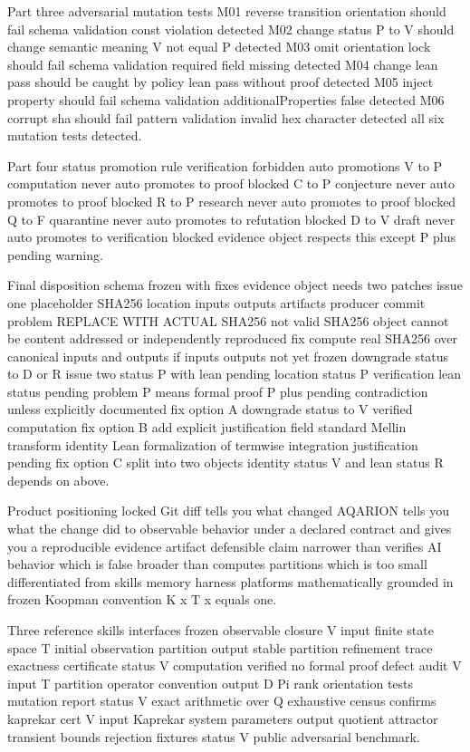 Part three adversarial mutation tests M01 reverse transition orientation should fail schema validation const violation detected M02 change status P to V should change semantic meaning V not equal P detected M03 omit orientation lock should fail schema validation required field missing detected M04 change lean pass should be caught by policy lean pass without proof detected M05 inject property should fail schema validation additionalProperties false detected M06 corrupt sha should fail pattern validation invalid hex character detected all six mutation tests detected.

Part four status promotion rule verification forbidden auto promotions V to P computation never auto promotes to proof blocked C to P conjecture never auto promotes to proof blocked R to P research never auto promotes to proof blocked Q to F quarantine never auto promotes to refutation blocked D to V draft never auto promotes to verification blocked evidence object respects this except P plus pending warning.

Final disposition schema frozen with fixes evidence object needs two patches issue one placeholder SHA256 location inputs outputs artifacts producer commit problem REPLACE WITH ACTUAL SHA256 not valid SHA256 object cannot be content addressed or independently reproduced fix compute real SHA256 over canonical inputs and outputs if inputs outputs not yet frozen downgrade status to D or R issue two status P with lean pending location status P verification lean status pending problem P means formal proof P plus pending contradiction unless explicitly documented fix option A downgrade status to V verified computation fix option B add explicit justification field standard Mellin transform identity Lean formalization of termwise integration justification pending fix option C split into two objects identity status V and lean status R depends on above.

Product positioning locked Git diff tells you what changed AQARION tells you what the change did to observable behavior under a declared contract and gives you a reproducible evidence artifact defensible claim narrower than verifies AI behavior which is false broader than computes partitions which is too small differentiated from skills memory harness platforms mathematically grounded in frozen Koopman convention K x T x equals one.

Three reference skills interfaces frozen observable closure V input finite state space T initial observation partition output stable partition refinement trace exactness certificate status V computation verified no formal proof defect audit V input T partition operator convention output D Pi rank orientation tests mutation report status V exact arithmetic over Q exhaustive census confirms kaprekar cert V input Kaprekar system parameters output quotient attractor transient bounds rejection fixtures status V public adversarial benchmark.

